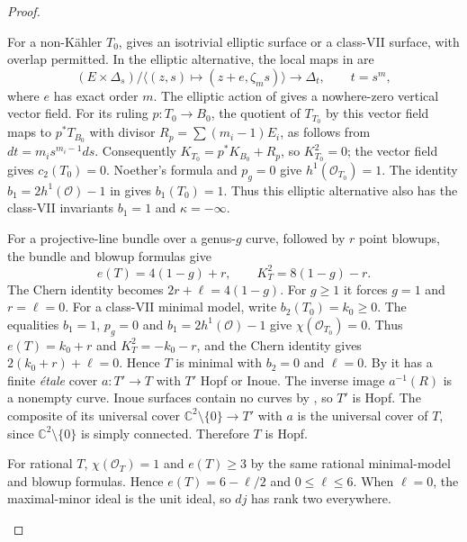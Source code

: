 \begin{proof}
\begin{enumerate}[label={$\langle1\rangle$\arabic*.},leftmargin=*]
For a non-K\"ahler $T_0$, \cite[Theorem~5.1, pp.~27--29]{OVV2020}
gives an isotrivial elliptic surface or a class-VII surface, with
overlap permitted. In the elliptic alternative, the local maps in
\cite[Theorem~4.2 and Remark~4.4, pp.~17--21]{OVV2020} are
\[
 (E\times\Delta_s)/\langle(z,s)\mapsto(z+e,\zeta_m s)\rangle
 \longrightarrow\Delta_t,\qquad t=s^m,
\]
where $e$ has exact order $m$. The elliptic action of
\cite[Proposition~4.5, pp.~21--22]{OVV2020} gives a nowhere-zero
vertical vector field. For its ruling $p:T_0\to B_0$, the quotient
of $T_{T_0}$ by this vector field maps to $p^*T_{B_0}$ with divisor
$R_p=\sum(m_i-1)E_i$, as follows from $dt=m_i s^{m_i-1}ds$.
Consequently $K_{T_0}=p^*K_{B_0}+R_p$, so $K_{T_0}^2=0$;
the vector field gives $c_2(T_0)=0$. Noether's formula and $p_g=0$
give $h^1(\mathcal O_{T_0})=1$.
The identity $b_1=2h^1(\mathcal O)-1$ in
\cite[Theorem~2.5, pp.~7--9]{OVV2020} gives $b_1(T_0)=1$.
Thus this elliptic alternative also has the class-VII invariants
$b_1=1$ and $\kappa=-\infty$.

For a projective-line bundle over a genus-$g$ curve, followed by
$r$ point blowups, the bundle and blowup formulas
\cite[II.3, pp.~17--18; III.18, pp.~46--47]{Beauville1978} give
\[
 e(T)=4(1-g)+r,\qquad K_T^2=8(1-g)-r.
\]
The Chern identity becomes $2r+\ell=4(1-g)$. For $g\ge1$ it forces
$g=1$ and $r=\ell=0$.
For a class-VII minimal model, write $b_2(T_0)=k_0\ge0$.
The equalities $b_1=1$, $p_g=0$ and
$b_1=2h^1(\mathcal O)-1$ give $\chi(\mathcal O_{T_0})=0$.
Thus $e(T)=k_0+r$ and $K_T^2=-k_0-r$, and the Chern identity gives
$2(k_0+r)+\ell=0$. Hence $T$ is minimal with $b_2=0$ and $\ell=0$.
By \cite[Theorem~1, p.~1]{BBK2019} it has a finite \emph{\'etale}
cover $a:T'\to T$ with $T'$ Hopf or Inoue. The inverse image
$a^{-1}(R)$ is a nonempty curve. Inoue surfaces contain no curves
by \cite[Proposition~2(i), pp.~274--275; Proposition~3(i), p.~277;
paragraph following (21), p.~279]{Inoue1974}, so $T'$ is Hopf.
The composite of its universal cover
$\mathbb C^2\setminus\{0\}\to T'$ with $a$ is the universal cover
of $T$, since $\mathbb C^2\setminus\{0\}$ is simply connected.
Therefore $T$ is Hopf.

For rational $T$, $\chi(\mathcal O_T)=1$ and $e(T)\ge3$ by the
same rational minimal-model and blowup formulas. Hence
$e(T)=6-\ell/2$ and $0\le\ell\le6$.
When $\ell=0$, the maximal-minor ideal is the unit ideal, so $dj$
has rank two everywhere.


\end{enumerate}
\end{proof}
